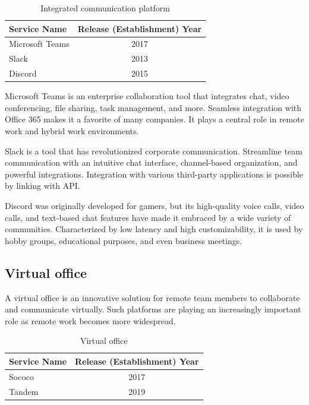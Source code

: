 \documentclass[12pt]{article}
\begin{document}
\begin{table}[h]
    \begin{center}
        \begin{tabular}{|l|c|} \hline
            Service Name    & Release (Establishment) Year \\ \hline
            Microsoft Teams & 2017                         \\
            Slack           & 2013                         \\
            Discord         & 2015                         \\ \hline
        \end{tabular}
        \caption{Integrated communication platform}
    \end{center}
\end{table}

Microsoft Teams is an enterprise collaboration tool that integrates chat, video
conferencing, file sharing, task management, and more. Seamless integration
with Office 365 makes it a favorite of many companies. It plays a central role
in remote work and hybrid work environments.

Slack is a tool that has revolutionized corporate communication. Streamline
team communication with an intuitive chat interface, channel-based
organization, and powerful integrations. Integration with various third-party
applications is possible by linking with API.

Discord was originally developed for gamers, but its high-quality voice calls,
video calls, and text-based chat features have made it embraced by a wide
variety of communities. Characterized by low latency and high customizability,
it is used by hobby groups, educational purposes, and even business meetings.

\subsection{Virtual office}
A virtual office is an innovative solution for remote team members to
collaborate and communicate virtually. Such platforms are playing an
increasingly important role as remote work becomes more widespread.

\begin{table}[h]
    \begin{center}
        \begin{tabular}{|l|c|} \hline
            Service Name & Release (Establishment) Year \\ \hline
            Sococo       & 2017                         \\
            Tandem       & 2019                         \\ \hline
        \end{tabular}
        \caption{Virtual office}
    \end{center}
\end{table}
\end{document}
